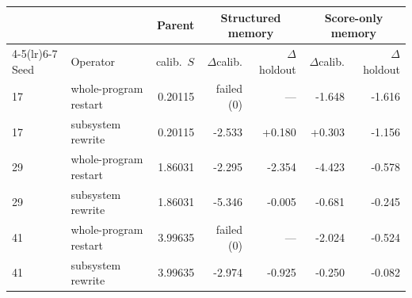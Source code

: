 \begin{tabular}{l l r rr rr}
\toprule
 & & Parent & \multicolumn{2}{c}{Structured memory} & \multicolumn{2}{c}{Score-only memory} \\
\cmidrule(lr){4-5}\cmidrule(lr){6-7}
Seed & Operator & calib.\ $S$ & $\Delta$calib. & $\Delta$holdout & $\Delta$calib. & $\Delta$holdout \\
\midrule
17 & whole-program restart & 0.20115 & failed (0) & --- & -1.648 & -1.616 \\
17 & subsystem rewrite & 0.20115 & -2.533 & +0.180 & +0.303 & -1.156 \\
29 & whole-program restart & 1.86031 & -2.295 & -2.354 & -4.423 & -0.578 \\
29 & subsystem rewrite & 1.86031 & -5.346 & -0.005 & -0.681 & -0.245 \\
41 & whole-program restart & 3.99635 & failed (0) & --- & -2.024 & -0.524 \\
41 & subsystem rewrite & 3.99635 & -2.974 & -0.925 & -0.250 & -0.082 \\
\bottomrule
\end{tabular}
